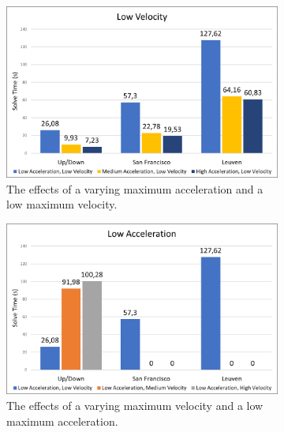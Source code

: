 \begin{figure}
	\centering
	
	\begin{subfigure}[t]{\textwidth}
        		\includegraphics[width=\textwidth]{img/agility-low-speed}
        		\caption{The effects of a varying maximum acceleration and a low maximum velocity.}
        		\label{fig:agility-low-speed}
	\end{subfigure}
	\par\bigskip
	\begin{subfigure}[t]{\textwidth}
        		\includegraphics[width=\textwidth]{img/agility-low-acc}
        		\caption{The effects of a varying maximum velocity and a low maximum acceleration.}
        		\label{fig:agility-low-acc}
	\end{subfigure}	
	
        
    \caption[The low velocity and low acceleration results]{}\label{fig:agility-low}
\end{figure}

